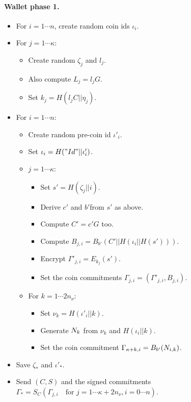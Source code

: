 \documentclass{llncs}
\begin{document}
\paragraph{Wallet phase 1.}
\begin{itemize}
\item  For $i = 1 \cdots n$, create random coin ids $\iota_i$.
\item  For $j = 1 \cdots \kappa$:
   \begin{itemize}
   \item  Create random $\zeta_j$ and $l_j$.
   \item  Also compute $L_j = l_j G$.
   \item  Set $k_j = H(l_j C || \eta_j)$.
   \end{itemize} 
\smallskip
\item  For $i = 1 \cdots n$:
   \begin{itemize}
   \item Create random pre-coin id $\iota'_i$.
   \item Set $\iota_i = H("Id" || \iota'_i)$.
   \item $j = 1 \cdots \kappa$:
      \begin{itemize}
      \item  Set $s' = H(\zeta_j || i)$.
      \item  Derive $c'$ and $b'$from $s'$ as above. 
      \item  Compute $C' = c' G$ too. 
      \item  Compute $B_{j,i} = B_{b'}(C' || H(\iota_i || H(s')))$. 
      \item  Encrypt $\Gamma'_{j,i} = E_{k_j}(s')$. 
      \item  Set the coin commitments $\Gamma_{j,i} = (\Gamma'_{j,i},B_{j,i})$.
      \end{itemize}
   \item  For $k = 1 \cdots 2 n_\nu$:
      \begin{itemize}
      \item  Set $\nu_k = H(\iota'_i || k)$.
      \item  Generate $N_k$ from $\nu_k$ and $H(\iota_i || k)$.
      \item  Set the coin commitment $\Gamma_{\kappa+k,i} = B_{b'}(N_{i,k})$.
      \end{itemize}
   \end{itemize} 
\smallskip
\item  Save $\zeta_*$ and $\iota'_*$.
\item  Send $(C,S)$ and the signed commitments
   $\Gamma_* = S_C( \Gamma_{j,i} \quad\textrm{for $j=1\cdots\kappa+2n_\nu, i=0 \cdots n$} )$.
\end{itemize}
\end{document}
